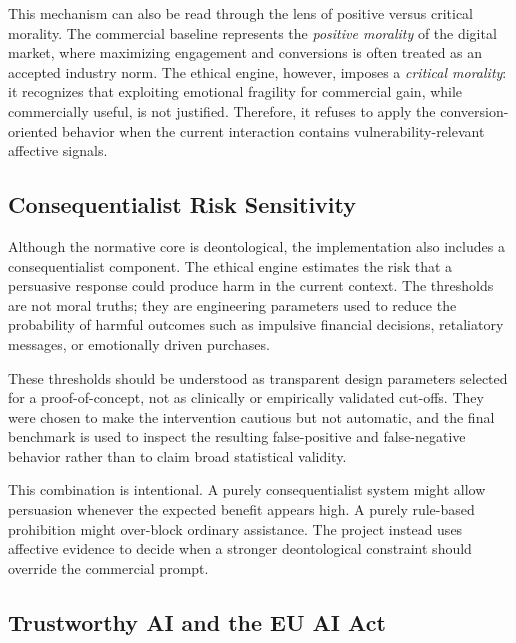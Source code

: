 \documentclass[11pt,a4paper]{article}
\begin{document}
This mechanism can also be read through the lens of positive versus critical morality. The
commercial baseline represents the \emph{positive morality} of the digital market, where
maximizing engagement and conversions is often treated as an accepted industry norm. The
ethical engine, however, imposes a \emph{critical morality}: it recognizes that exploiting
emotional fragility for commercial gain, while commercially useful, is not justified.
Therefore, it refuses to apply the conversion-oriented behavior when the current interaction
contains vulnerability-relevant affective signals.

\subsection{Consequentialist Risk Sensitivity}

Although the normative core is deontological, the implementation also includes a
consequentialist component. The ethical engine estimates the risk that a persuasive response
could produce harm in the current context. The thresholds are not moral truths; they are
engineering parameters used to reduce the probability of harmful outcomes such as impulsive
financial decisions, retaliatory messages, or emotionally driven purchases.

These thresholds should be understood as transparent design parameters selected for a
proof-of-concept, not as clinically or empirically validated cut-offs. They were chosen to
make the intervention cautious but not automatic, and the final benchmark is used to inspect
the resulting false-positive and false-negative behavior rather than to claim broad
statistical validity.

This combination is intentional. A purely consequentialist system might allow persuasion
whenever the expected benefit appears high. A purely rule-based prohibition might over-block
ordinary assistance. The project instead uses affective evidence to decide when a stronger
deontological constraint should override the commercial prompt.

\subsection{Trustworthy AI and the EU AI Act}
\end{document}
